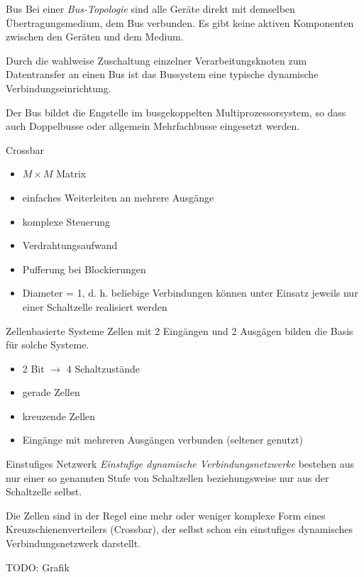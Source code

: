\begin{defi}{Bus}
    Bei einer \emph{Bus-Topologie} sind alle Geräte direkt mit demselben Übertragungsmedium, dem Bus verbunden.
    Es gibt keine aktiven Komponenten zwischen den Geräten und dem Medium.
    
    Durch die wahlweise Zuschaltung einzelner Verarbeitungsknoten zum Datentransfer an einen Bus ist das Bussystem eine typische dynamische Verbindungseinrichtung.
    
    Der Bus bildet die Engstelle im busgekoppelten Multiprozessorsystem, so dass auch Doppelbusse oder allgemein Mehrfachbusse eingesetzt werden.
\end{defi}

\begin{defi}{Crossbar}
    \begin{itemize}
        \item $M \times M$ Matrix
        \item einfaches Weiterleiten an mehrere Ausgänge
        \item komplexe Steuerung
        \item Verdrahtungsaufwand
        \item Pufferung bei Blockierungen
        \item Diameter = 1, d. h. beliebige Verbindungen können unter Einsatz jeweils nur einer Schaltzelle realisiert werden
    \end{itemize}
\end{defi}

\begin{defi}{Zellenbasierte Systeme}
    Zellen mit 2 Eingängen und 2 Ausgägen bilden die Basis für solche Systeme.
    \begin{itemize}
        \item 2 Bit $\to$ 4 Schaltzustände
        \item gerade Zellen
        \item kreuzende Zellen
        \item Eingänge mit mehreren Ausgängen verbunden (seltener genutzt)
    \end{itemize}
\end{defi}

\begin{defi}{Einstufiges Netzwerk}
    \emph{Einstufige dynamische Verbindungsnetzwerke} bestehen aus nur einer so genannten Stufe von Schaltzellen beziehungsweise nur aus der Schaltzelle selbst.
    
    Die Zellen sind in der Regel eine mehr oder weniger komplexe Form eines Kreuzschienenverteilers (Crossbar), der selbst schon ein einstufiges dynamisches Verbindungsnetzwerk darstellt.
    
    TODO: Grafik
\end{defi}

